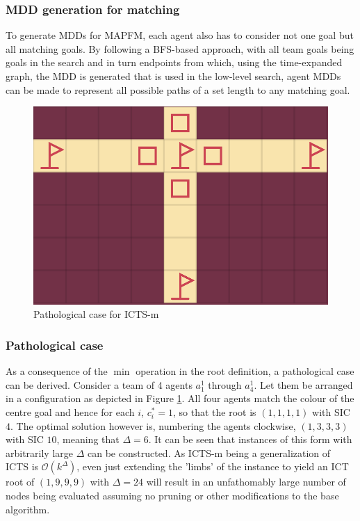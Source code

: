 \documentclass[english,10pt]{article}
\begin{document}
	\subsubsection{MDD generation for matching}
	To generate MDDs for MAPFM, each agent also has to consider not one goal but all matching goals. By following a BFS-based approach, with all team goals being goals in the search and in turn endpoints from which, using the time-expanded graph, the MDD is generated that is used in the low-level search, agent MDDs can be made to represent all possible paths of a set length to any matching goal.
	\begin{figure}
		\centering
		\includegraphics[width=\linewidth]{img/path}
		\caption{Pathological case for ICTS-m}
		\label{fig:path}
	\end{figure}
	\subsubsection{Pathological case}
	\label{pathology}
	As a consequence of the $\min$ operation in the root definition, a pathological case can be derived. Consider a team of 4 agents $a_1^1$ through $a_4^1$. Let them be arranged in a configuration as depicted in Figure \ref{fig:path}. All four agents match the colour of the centre goal and hence for each $i$, $c^*_i = 1$, so that the root is $(1,1,1,1)$ with SIC $4$. The optimal solution however is, numbering the agents clockwise, $(1,3,3,3)$ with SIC $10$, meaning that $\Delta = 6$. It can be seen that instances of this form with arbitrarily large $\Delta$ can be constructed. As ICTS-m being a generalization of ICTS is $\mathcal{O}(k^\Delta)$, even just extending the 'limbs' of the instance to yield an ICT root of $(1,9,9,9)$ with $\Delta = 24$ will result in an unfathomably large number of nodes being evaluated assuming no pruning or other modifications to the base algorithm.
	
\end{document}
